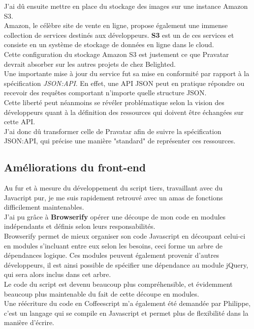 \documentclass{report}
\begin{document}
      J'ai dû ensuite mettre en place du stockage des images sur une instance Amazon S3.\\
      Amazon, le célèbre site de vente en ligne, propose également une immense collection de services destinés aux développeurs. \textbf{S3} est un de ces services et consiste en un système
      de stockage de données en ligne dans le cloud.\\
      Cette configuration du stockage Amazon S3 est justement ce que Pravatar devrait absorber sur les autres projets de chez Belighted.\\

      Une importante mise à jour du service fut sa mise en conformité par rapport à la spécification \textit{JSON:API}. En effet, une API JSON peut en pratique répondre ou recevoir des requêtes
      comportant n'importe quelle structure JSON.\\
      Cette liberté peut néanmoins se révéler problématique selon la vision des développeurs quant à la définition des ressources qui doivent être échangées sur cette API.\\
      J'ai donc dû transformer celle de Pravatar afin de suivre la spécification JSON:API, qui précise une manière "standard" de représenter ces ressources.\\

    \subsection{Améliorations du front-end}
    \label{sub:Améliorations du front-end}

      Au fur et à mesure du développement du script tiers, travaillant avec du Javacript pur, je me suis rapidement retrouvé avec un amas de fonctions difficilement maintenables.\\
      J'ai pu grâce à \textbf{Browserify} opérer une découpe de mon code en modules indépendants et définis selon leurs responsabilités.\\ Browserify permet de mieux organiser son code Javascript en découpant
      celui-ci en modules s'incluant entre eux selon les besoins, ceci forme un arbre de dépendances logique. Ces modules peuvent également provenir d'autres développeurs, il est ainsi possible de spécifier une dépendance
      au module jQuery, qui sera alors inclus dans cet arbre.\\
      Le code du script est devenu beaucoup plus compréhensible, et évidemment beaucoup plus maintenable du fait de cette découpe en modules.\\
      Une réécriture du code en Coffeescript m'a également été demandée par Philippe, c'est un langage qui se compile en Javascript et permet plus de flexibilité dans la manière d'écrire.\\
\end{document}
